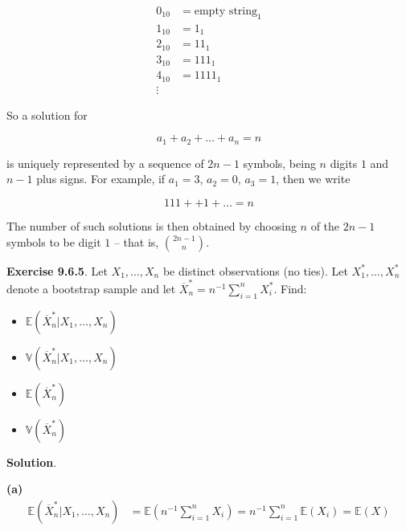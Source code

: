 \begin{align*}
0_{10} & = \text{empty string}_{1} \\
1_{10} & = 1_{1} \\
2_{10} & = 11_{1} \\
3_{10} & = 111_{1} \\
4_{10} & = 1111_{1} \\
\vdots
\end{align*}

So a solution for

\[a_{1} + a_{2} + \dots + a_{n} = n\]

is uniquely represented by a sequence of \(2n - 1\) symbols, being \(n\)
digits \(1\) and \(n - 1\) plus signs. For example, if \(a_{1} = 3\),
\(a_{2} = 0\), \(a_{3} = 1\), then we write

\[ 111 + + 1 + \dots = n \]

The number of such solutions is then obtained by choosing \(n\) of the
\(2n - 1\) symbols to be digit \(1\) -- that is, \(\binom{2n - 1}{n}\).

\textbf{Exercise 9.6.5}. Let \(X_{1}, \dots, X_{n}\) be distinct
observations (no ties). Let \(X_{1}^*, \dots, X_{n}^*\) denote a bootstrap
sample and let \(\overline{X}_{n}^* = n^{-1}\sum_{i=1}^{n}X_{i}^*\). Find:

\begin{itemize}[tightlist]
\item
  \(\mathbb{E}(\overline{X}_{n}^* | X_{1}, \dots, X_{n})\)
\item
  \(\mathbb{V}(\overline{X}_{n}^* | X_{1}, \dots, X_{n})\)
\item
  \(\mathbb{E}(\overline{X}_{n}^*)\)
\item
  \(\mathbb{V}(\overline{X}_{n}^*)\)
\end{itemize}

\textbf{Solution}.

\textbf{(a)} \begin{align*}
\mathbb{E}(\overline{X}_{n}^* | X_{1}, \dots, X_{n}) &= \mathbb{E}\left(n^{-1}\sum_{i=1}^{n}X_{i}\right) = n^{-1}\sum_{i=1}^{n} \mathbb{E}(X_{i}) = \mathbb{E}(X)
\end{align*}

